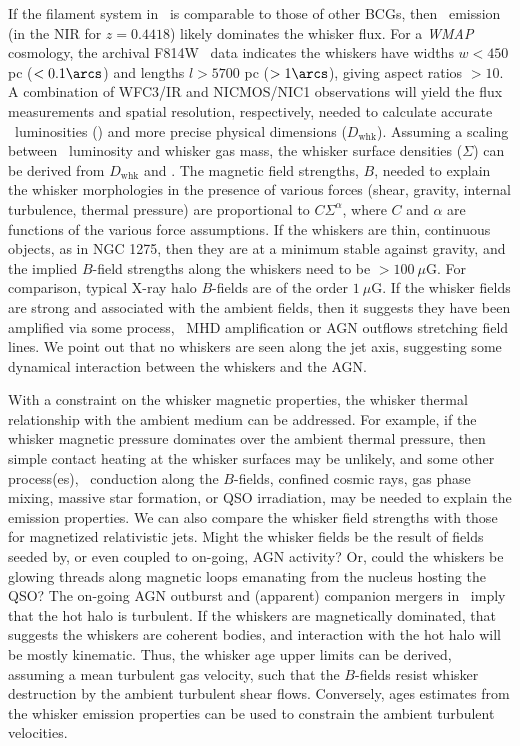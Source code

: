 \documentclass[12pt]{article}
\begin{document}
If the filament system in \irs\ is comparable to those of other BCGs,
then \halpha\ emission (in the NIR for $z=0.4418$) likely dominates
the whisker flux. For a {\it{WMAP}} cosmology, the archival F814W
\hst\ data indicates the whiskers have widths $w < 450$ pc ($<
0.1\arcs$) and lengths $l > 5700$ pc ($> 1\arcs$), giving aspect
ratios $> 10$. A combination of WFC3/IR and NICMOS/NIC1 observations
will yield the flux measurements and spatial resolution, respectively,
needed to calculate accurate \halpha\ luminosities (\lha) and more
precise physical dimensions ($D_{\mathrm{whk}}$). Assuming a scaling
between \halpha\ luminosity and whisker gas mass, the whisker surface
densities ($\Sigma$) can be derived from $D_{\mathrm{whk}}$ and
\lha. The magnetic field strengths, $B$, needed to explain the whisker
morphologies in the presence of various forces (shear, gravity,
internal turbulence, thermal pressure) are proportional to
$C\Sigma^\alpha$, where $C$ and $\alpha$ are functions of the various
force assumptions. If the whiskers are thin, continuous objects, as in
NGC 1275, then they are at a minimum stable against gravity, and the
implied $B$-field strengths along the whiskers need to be $> 100
~\mu$G. For comparison, typical X-ray halo $B$-fields are of the order
$1 ~\mu$G. If the whisker fields are strong and associated with the
ambient fields, then it suggests they have been amplified via some
process, \eg\ MHD amplification or AGN outflows stretching field
lines. We point out that no whiskers are seen along the jet axis,
suggesting some dynamical interaction between the whiskers and the
AGN.

With a constraint on the whisker magnetic properties, the whisker
thermal relationship with the ambient medium can be addressed. For
example, if the whisker magnetic pressure dominates over the ambient
thermal pressure, then simple contact heating at the whisker surfaces
may be unlikely, and some other process(es), \eg\ conduction along the
$B$-fields, confined cosmic rays, gas phase mixing, massive star
formation, or QSO irradiation, may be needed to explain the emission
properties. We can also compare the whisker field strengths with those
for magnetized relativistic jets. Might the whisker fields be the
result of fields seeded by, or even coupled to on-going, AGN activity?
Or, could the whiskers be glowing threads along magnetic loops
emanating from the nucleus hosting the QSO? The on-going AGN outburst
and (apparent) companion mergers in \irs\ imply that the hot halo is
turbulent. If the whiskers are magnetically dominated, that suggests
the whiskers are coherent bodies, and interaction with the hot halo
will be mostly kinematic. Thus, the whisker age upper limits can be
derived, assuming a mean turbulent gas velocity, such that the
$B$-fields resist whisker destruction by the ambient turbulent shear
flows. Conversely, ages estimates from the whisker emission properties
can be used to constrain the ambient turbulent velocities.
\end{document}
